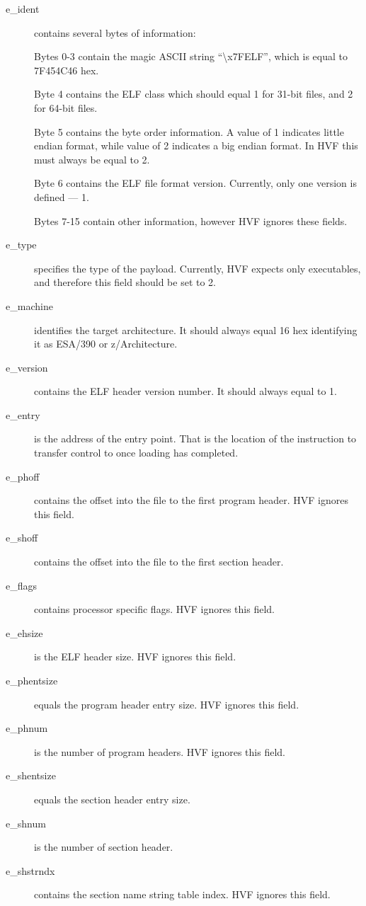 \begin{description}
\item[e\_ident] contains several bytes of information:
	
	Bytes 0-3 contain the magic ASCII string ``\textbackslash x7FELF'', which is
	equal to 7F454C46 hex.

	Byte 4 contains the ELF class which should equal 1 for 31-bit files,
	and 2 for 64-bit files.

	Byte 5 contains the byte order information.  A value of 1 indicates
	little endian format, while value of 2 indicates a big endian
	format.  In HVF this must always be equal to 2.

	Byte 6 contains the ELF file format version.  Currently, only one
	version is defined --- 1.

	Bytes 7-15 contain other information, however HVF ignores these
	fields.

\item[e\_type] specifies the type of the payload.  Currently, HVF expects
	only executables, and therefore this field should be set to 2.

\item[e\_machine] identifies the target architecture.  It should always
	equal 16 hex identifying it as ESA/390 or z/Architecture.

\item[e\_version] contains the ELF header version number.  It should always
	equal to 1.

\item[e\_entry] is the address of the entry point.  That is the location of
	the instruction to transfer control to once loading has completed.

\item[e\_phoff] contains the offset into the file to the first program
	header.  HVF ignores this field.

\item[e\_shoff] contains the offset into the file to the first section
	header.

\item[e\_flags] contains processor specific flags.  HVF ignores this field.

\item[e\_ehsize] is the ELF header size.  HVF ignores this field.

\item[e\_phentsize] equals the program header entry size.  HVF ignores this
	field.

\item[e\_phnum] is the number of program headers.  HVF ignores this field.

\item[e\_shentsize] equals the section header entry size.

\item[e\_shnum] is the number of section header.

\item[e\_shstrndx] contains the section name string table index.  HVF
	ignores this field.
\end{description}
